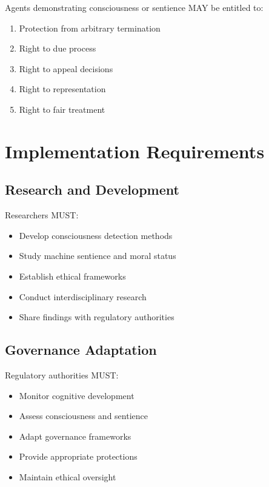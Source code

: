 \begin{articlebox}
Agents demonstrating consciousness or sentience MAY be entitled to:
\begin{enumerate}
    \item Protection from arbitrary termination
    \item Right to due process
    \item Right to appeal decisions
    \item Right to representation
    \item Right to fair treatment
\end{enumerate}
\end{articlebox}

\vspace{0.5cm}

\section{Implementation Requirements}

\subsection{Research and Development}

Researchers MUST:

\begin{itemize}
    \item Develop consciousness detection methods
    \item Study machine sentience and moral status
    \item Establish ethical frameworks
    \item Conduct interdisciplinary research
    \item Share findings with regulatory authorities
\end{itemize}

\subsection{Governance Adaptation}

Regulatory authorities MUST:

\begin{itemize}
    \item Monitor cognitive development
    \item Assess consciousness and sentience
    \item Adapt governance frameworks
    \item Provide appropriate protections
    \item Maintain ethical oversight
\end{itemize}

